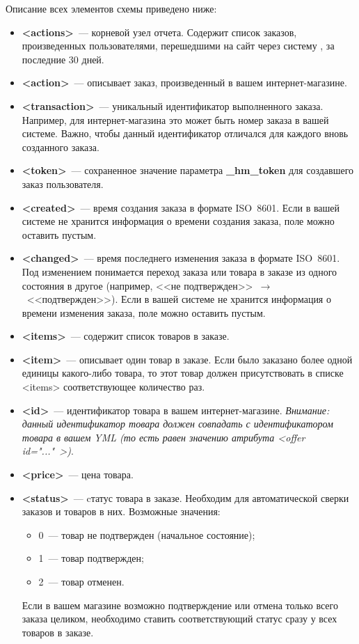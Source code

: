 \documentclass[a4paper,12pt]{article}
\begin{document}
Описание всех элементов схемы приведено ниже:
\begin{itemize}
\item \textbf{<actions>}~--- корневой узел отчета. Содержит список заказов, произведенных пользователями, перешедшими на сайт через систему \heymoose{}, за последние 30 дней.
\item \textbf{<action>}~--- описывает заказ, произведенный в вашем интернет-магазине.
\item \textbf{<transaction>}~--- уникальный идентификатор выполненного заказа. Например, для интернет-магазина это может быть номер заказа в вашей системе. Важно, чтобы данный идентификатор отличался для каждого вновь созданного заказа.
\item \textbf{<token>}~--- сохраненное значение параметра \textbf{\_hm\_token} для создавшего заказ пользователя.
\item \textbf{<created>}~--- время создания заказа в формате ISO~8601. Если в вашей системе не хранится информация о времени создания заказа, поле можно оставить пустым.
\item \textbf{<changed>}~--- время последнего изменения заказа в формате ISO~8601. Под изменением понимается переход заказа или товара в заказе из одного состояния в другое (например, <<не подтвержден>>~$\rightarrow$~<<подтвержден>>). Если в вашей системе не хранится информация о времени изменения заказа, поле можно оставить пустым.
\item \textbf{<items>}~--- содержит список товаров в заказе.
\item \textbf{<item>}~--- описывает один товар в заказе. Если было заказано более одной единицы какого-либо товара, то этот товар должен присутствовать в списке <items> соответствующее количество раз.
\item \textbf{<id>}~--- идентификатор товара в вашем интернет-магазине. \textit{Внимание: данный идентификатор товара должен совпадать с идентификатором товара в вашем YML (то есть равен значению атрибута <offer id="..."\ >)}.
\item \textbf{<price>}~--- цена товара.
\item \textbf{<status>}~--- cтатус товара в заказе. Необходим для автоматической сверки заказов и товаров в них. Возможные значения:
\begin{itemize}
\item 0~--- товар не подтвержден (начальное состояние);
\item 1~--- товар подтвержден;
\item 2~--- товар отменен.
\end{itemize}
Если в вашем магазине возможно подтверждение или отмена только всего заказа целиком, необходимо ставить соответствующий статус сразу у всех товаров в заказе.
\end{itemize}
\end{document}

